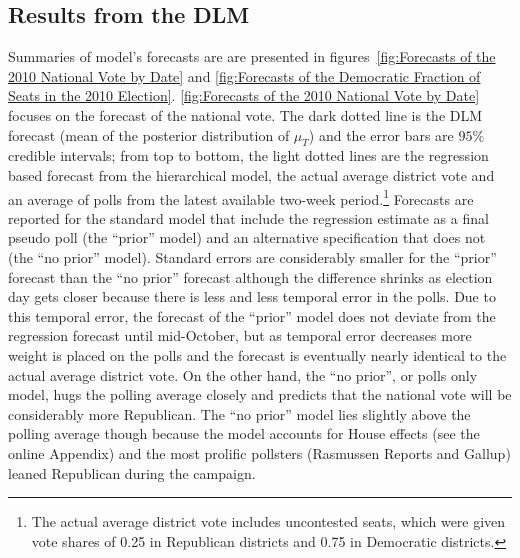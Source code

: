 \documentclass[12pt,final,fleqn]{article}
\theoremstyle{plain}
\begin{document}
\subsection{Results from the DLM} \label{sec: Results from the DLM}
Summaries of model's forecasts are are presented in figures~\ref{fig:Forecasts of the 2010 National Vote by Date} and \ref{fig:Forecasts of the Democratic Fraction of Seats in the 2010 Election}. \autoref{fig:Forecasts of the 2010 National Vote by Date} focuses on the forecast of the national vote. The dark dotted line is the DLM forecast (mean of the posterior distribution of $\mu_T$) and the error bars are $95\%$ credible intervals; from top to bottom, the light dotted lines are the regression based forecast from the hierarchical model, the actual average district vote and an average of polls from the latest available two-week period.\footnote{The actual average district vote includes uncontested seats, which were given vote shares of 0.25 in Republican districts and 0.75 in Democratic districts.} Forecasts are reported for the standard model that include the regression estimate as a final pseudo poll (the ``prior'' model) and an alternative specification that does not (the ``no prior'' model). Standard errors are considerably smaller for the ``prior'' forecast than the ``no prior'' forecast although the difference shrinks as election day gets closer because there is less and less temporal error in the polls. Due to this temporal error, the forecast of the ``prior'' model does not deviate from the regression forecast until mid-October, but as temporal error decreases more weight is placed on the polls and the forecast is eventually nearly identical to the actual average district vote. On the other hand, the ``no prior'', or polls only model, hugs the polling average closely and predicts that the national vote will be considerably more Republican. The ``no prior'' model lies slightly above the polling average though because the model accounts for House effects (see the online Appendix) and the most prolific pollsters (Rasmussen Reports and Gallup) leaned Republican during the campaign. 
\end{document}
